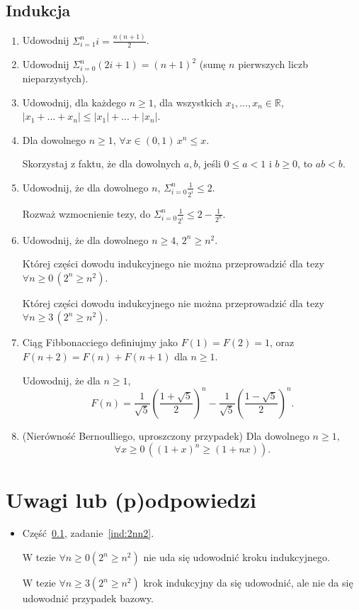 \documentclass[12pt]{article}
\newcommand{\bR}{\mathbb{R}}
\begin{document}
\subsection{Indukcja}\label{ss:indukcja}
\begin{enumerate}
    \item Udowodnij $\Sigma_{i=1}^n i = \frac{n(n+1)}{2}$. 
    \item Udowodnij $\Sigma_{i=0}^n (2i+1) = (n+1)^2$
           (sumę $n$ pierwszych liczb nieparzystych).
    \item Udowodnij, dla każdego $n\geq 1$, dla wszystkich $x_1,\dots, x_n\in \bR$, $|x_1 + ... + x_n| \leq  |x_1| + ... + |x_n|$.
\item 
Dla dowolnego  $n\geq 1$, $\forall x \in (0,1)\, x^n \leq  x$.

Skorzystaj z faktu, że dla dowolnych $a,b$, jeśli $0\leq a < 1$ i $b\geq 0$, to $ab<b$.

\item 
Udowodnij, że dla dowolnego $n$, $\Sigma_{i=0}^n \frac{1}{2^i} \leq 2$.

Rozważ wzmocnienie  tezy, 
do $\Sigma_{i=0}^n \frac{1}{2^i} \leq 2-\frac{1}{2^{n}}$.

\item \label{ind:2nn2} Udowodnij, że dla dowolnego $n\geq 4$, $2^n\geq  n^2$.

Której części dowodu indukcyjnego nie można przeprowadzić 
dla tezy $\forall n\geq 0\, (2^n\geq n^2)$.

Której części dowodu indukcyjnego nie można przeprowadzić 
dla tezy $\forall n\geq 3\, (2^n\geq n^2)$.


\item Ciąg Fibbonacciego definiujmy jako 
$F(1)=F(2)=1$, oraz $F(n+2)=F(n)+F(n+1)$ dla $n\geq 1$.

Udowodnij, że dla $n\geq 1$, 
$$
F(n)=\frac{1}{\sqrt{5}}\left(\frac{1+\sqrt{5}}{2}\right)^n- 
    \frac{1}{\sqrt{5}}\left(\frac{1-\sqrt{5}}{2}\right)^n.
$$

\item 
(Nierówność Bernoulliego, uproszczony przypadek) Dla dowolnego $n\geq 1$, 
\[
\forall x \geq 0\, ((1+x)^n \geq (1+nx)).
\]

\end{enumerate}

\section{Uwagi lub (p)odpowiedzi}


\begin{itemize}
    \item Część~\ref{ss:indukcja}, zadanie~\ref{ind:2nn2}. 
     
     W tezie $\forall n\geq 0 (2^n\geq n^2)$ nie uda się 
     udowodnić kroku indukcyjnego.
     
     W tezie $\forall n\geq 3 (2^n\geq n^2)$ krok indukcyjny da się udowodnić, ale nie da się udowodnić przypadek bazowy.
\end{itemize}



\end{document}
